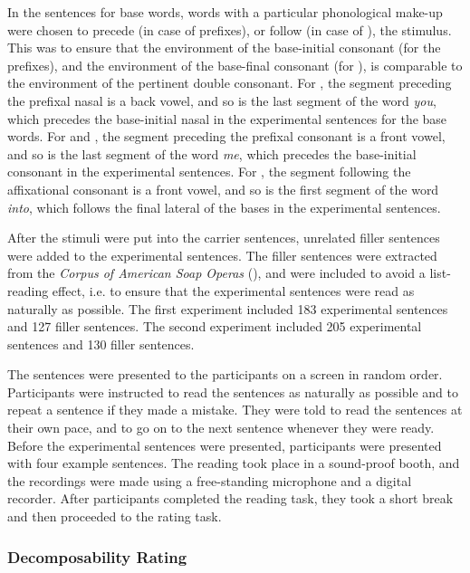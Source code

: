 In the sentences for base words, words with a particular phonological make-up were chosen to precede (in case of prefixes), or follow (in case of ), the stimulus. This was to ensure that the environment of the base-initial consonant (for the prefixes), and the environment of the base-final consonant (for ), is comparable to the environment of the pertinent double consonant.
For , the segment preceding the prefixal nasal is a back vowel, and so is the last segment of the word \textit{you}, which precedes the base-initial nasal in the experimental sentences for the base words. 
For  and , the segment preceding the prefixal consonant is a front vowel, and so is the last segment of the word \textit{me}, which precedes the base-initial consonant in the experimental sentences. 
For , the segment following the affixational consonant is a front vowel, and so is the first segment of the word \textit{into}, which follows the final lateral of the bases in the experimental sentences. 




After the stimuli were put into the carrier sentences, unrelated filler sentences were added to the experimental sentences. The filler sentences were extracted from the \textit{Corpus of American Soap Operas} (\citealt{Davies.2011}), and were included  to avoid a list-reading effect, i.e. to ensure that the experimental sentences were read as naturally as possible. The first experiment included 183 experimental sentences and 127 filler sentences. The second experiment included 205 experimental sentences and 130 filler sentences. 

The sentences were presented to the participants on a screen in random order. 
Participants were instructed to read the sentences as naturally as possible and to repeat a sentence if they made a mistake. They were told to read the sentences at their own pace, and to go on to the next sentence whenever they were ready. Before the experimental sentences were presented, participants were presented with four example sentences. 
The reading took place in a sound-proof booth, and the recordings were made using a free-standing microphone and a digital recorder.
 After participants completed the reading task, they took a short break and then proceeded to the rating task.




\subsubsection{Decomposability Rating}


